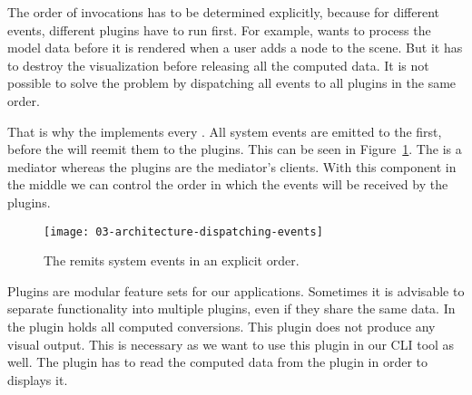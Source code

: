 \documentclass[../../ClassicThesis.tex]{subfiles}
\begin{document}
The order of  invocations has to be
determined explicitly, because for different events,
different plugins have to run first. For example,
{\platener} wants to process the model data before it is
rendered when a user adds a node to the scene. But it has to
destroy the visualization before releasing all the computed
data. It is not possible to solve the problem by dispatching
all events to all plugins in the same order.

That is why the  implements every
. All system events are emitted to the
 first, before the  will
reemit them to the plugins. This can be seen in
Figure~\ref{fig:dispatching-events}. The 
is a mediator whereas the plugins are the mediator's
clients. With this component in the middle we can control
the order in which the events will be received by the
plugins.

\begin{figure}[h]
  \centering
  \texttt{[image: 03-architecture-dispatching-events]}
  \caption{The  remits system events in an explicit order.}
  \label{fig:dispatching-events}
\end{figure}

Plugins are modular feature sets for our applications.
Sometimes it is advisable to separate functionality into
multiple plugins, even if they share the same data. In
{\platener} the  plugin holds all
computed conversions. This plugin does not produce any
visual output. This is necessary as we want to use this
plugin in our CLI tool as well. The 
plugin has to read the computed data from the
 plugin in order to displays it.
\end{document}
